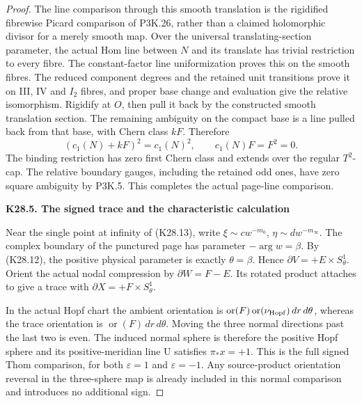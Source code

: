 \begin{proof}
The line comparison through this smooth translation is the
rigidified fibrewise Picard comparison of P3K.26, rather than
a claimed holomorphic divisor for a merely smooth map. Over the
universal translating-section parameter, the actual Hom line
between \(N\) and its translate has trivial restriction to every
fibre. The constant-factor line uniformization proves this on the
smooth fibres. The reduced component degrees and the retained
unit transitions prove it on III, IV and \(I_2\) fibres, and
proper base change and evaluation give the relative isomorphism.
Rigidify at \(O\), then pull it back by the constructed smooth
translation section. The remaining ambiguity on the compact
base is a line pulled back from that base, with Chern class
\(kF\). Therefore
\[
                    (c_1(N)+kF)^2=c_1(N)^2,
 \qquad c_1(N)F=F^2=0 .
 \tag{K28.26}
\]
The binding restriction has zero first Chern class and extends over
the regular \(T^2\)-cap. The relative boundary gauges, including
the retained odd ones, have zero square ambiguity by P3K.5.
This completes the actual page-line comparison.

\par

\medskip\noindent\textbf{K28.5. The signed trace and the characteristic calculation}

\par\nobreak

Near the single point at infinity of (K28.13), write
\(\xi\sim c w^{-m_0}\), \(\eta\sim d w^{-m_\infty}\).
The complex boundary of the punctured page has parameter
\(-\arg w=\beta\). By (K28.12), the positive physical parameter
is exactly \(\theta=\beta\). Hence
\(\partial V=+E\times S^1_\theta\).
Orient the actual nodal compression by \(\partial W=F-E\).
Its rotated product attaches to give a trace with
\(\partial X=+F\times S^1_\theta\).

In the actual Hopf chart the ambient orientation is
\(\operatorname{or}(F)\operatorname{or}(\nu_{\rm Hopf})\,dr\,d\theta\),
whereas the trace orientation is
\(\operatorname{or}(F)\,dr\,d\theta\).
Moving the three normal directions past the last two is even.
The induced normal sphere is therefore the positive Hopf sphere
and its positive-meridian line U satisfies \(\pi_*x=+1\).
This is the full signed Thom comparison, for both
\(\varepsilon=1\) and \(\varepsilon=-1\). Any source-product
orientation reversal in the three-sphere map is already included
in this normal comparison and introduces no additional sign.


\end{proof}
